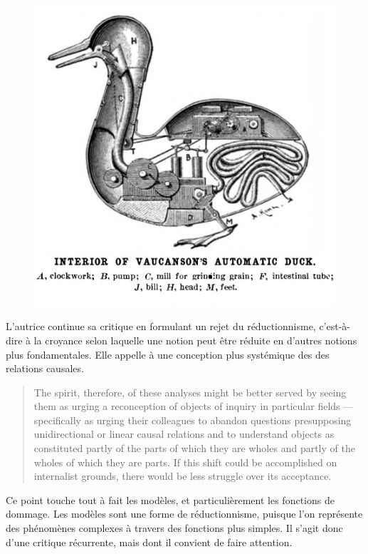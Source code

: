 \begin{figure}
    \centering
    \includegraphics[width=0.75\linewidth]{reductionisme.png}
    \label{fig:reductionnisme}
\end{figure}

\begin{quote}
    
\end{quote}

L'autrice continue sa critique en formulant un rejet du réductionnisme, c'est-à-dire à la croyance selon laquelle une notion peut être réduite en d'autres notions plus fondamentales. Elle appelle à une conception plus systémique des des relations causales. 

\begin{quote}
    The spirit, therefore, of these analyses might be better served by seeing them as urging a reconception of objects of inquiry in particular fields — specifically as urging their colleagues to abandon questions presupposing unidirectional or linear causal relations and to understand objects as constituted partly of the parts of which they are wholes and partly of the wholes of which they are parts. If this shift could be accomplished on internalist grounds, there would be less struggle over its acceptance.
\end{quote}

Ce point touche tout à fait les modèles, et particulièrement les fonctions de dommage. Les modèles sont une forme de réductionnisme, puisque l'on représente des phénomènes complexes à travers des fonctions plus simples. Il s'agit donc d'une critique récurrente, mais dont il convient de faire attention. \\


